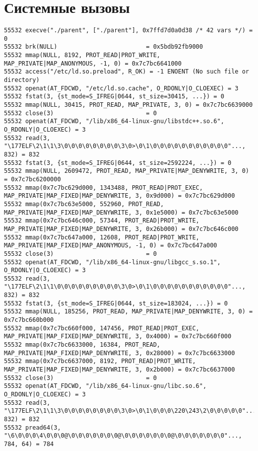 \section{Системные вызовы}
\begin{verbatim}
55532 execve("./parent", ["./parent"], 0x7ffd7d0a0d38 /* 42 vars */) = 0
55532 brk(NULL)                         = 0x5bdb92fb9000
55532 mmap(NULL, 8192, PROT_READ|PROT_WRITE, MAP_PRIVATE|MAP_ANONYMOUS, -1, 0) = 0x7c7bc6641000
55532 access("/etc/ld.so.preload", R_OK) = -1 ENOENT (No such file or directory)
55532 openat(AT_FDCWD, "/etc/ld.so.cache", O_RDONLY|O_CLOEXEC) = 3
55532 fstat(3, {st_mode=S_IFREG|0644, st_size=30415, ...}) = 0
55532 mmap(NULL, 30415, PROT_READ, MAP_PRIVATE, 3, 0) = 0x7c7bc6639000
55532 close(3)                          = 0
55532 openat(AT_FDCWD, "/lib/x86_64-linux-gnu/libstdc++.so.6", O_RDONLY|O_CLOEXEC) = 3
55532 read(3, "\177ELF\2\1\1\3\0\0\0\0\0\0\0\0\3\0>\0\1\0\0\0\0\0\0\0\0\0\0\0"..., 832) = 832
55532 fstat(3, {st_mode=S_IFREG|0644, st_size=2592224, ...}) = 0
55532 mmap(NULL, 2609472, PROT_READ, MAP_PRIVATE|MAP_DENYWRITE, 3, 0) = 0x7c7bc6200000
55532 mmap(0x7c7bc629d000, 1343488, PROT_READ|PROT_EXEC, MAP_PRIVATE|MAP_FIXED|MAP_DENYWRITE, 3, 0x9d000) = 0x7c7bc629d000
55532 mmap(0x7c7bc63e5000, 552960, PROT_READ, MAP_PRIVATE|MAP_FIXED|MAP_DENYWRITE, 3, 0x1e5000) = 0x7c7bc63e5000
55532 mmap(0x7c7bc646c000, 57344, PROT_READ|PROT_WRITE, MAP_PRIVATE|MAP_FIXED|MAP_DENYWRITE, 3, 0x26b000) = 0x7c7bc646c000
55532 mmap(0x7c7bc647a000, 12608, PROT_READ|PROT_WRITE, MAP_PRIVATE|MAP_FIXED|MAP_ANONYMOUS, -1, 0) = 0x7c7bc647a000
55532 close(3)                          = 0
55532 openat(AT_FDCWD, "/lib/x86_64-linux-gnu/libgcc_s.so.1", O_RDONLY|O_CLOEXEC) = 3
55532 read(3, "\177ELF\2\1\1\0\0\0\0\0\0\0\0\0\3\0>\0\1\0\0\0\0\0\0\0\0\0\0\0"..., 832) = 832
55532 fstat(3, {st_mode=S_IFREG|0644, st_size=183024, ...}) = 0
55532 mmap(NULL, 185256, PROT_READ, MAP_PRIVATE|MAP_DENYWRITE, 3, 0) = 0x7c7bc660b000
55532 mmap(0x7c7bc660f000, 147456, PROT_READ|PROT_EXEC, MAP_PRIVATE|MAP_FIXED|MAP_DENYWRITE, 3, 0x4000) = 0x7c7bc660f000
55532 mmap(0x7c7bc6633000, 16384, PROT_READ, MAP_PRIVATE|MAP_FIXED|MAP_DENYWRITE, 3, 0x28000) = 0x7c7bc6633000
55532 mmap(0x7c7bc6637000, 8192, PROT_READ|PROT_WRITE, MAP_PRIVATE|MAP_FIXED|MAP_DENYWRITE, 3, 0x2b000) = 0x7c7bc6637000
55532 close(3)                          = 0
55532 openat(AT_FDCWD, "/lib/x86_64-linux-gnu/libc.so.6", O_RDONLY|O_CLOEXEC) = 3
55532 read(3, "\177ELF\2\1\1\3\0\0\0\0\0\0\0\0\3\0>\0\1\0\0\0\220\243\2\0\0\0\0\0"..., 832) = 832
55532 pread64(3, "\6\0\0\0\4\0\0\0@\0\0\0\0\0\0\0@\0\0\0\0\0\0\0@\0\0\0\0\0\0\0"..., 784, 64) = 784

\end{verbatim}
